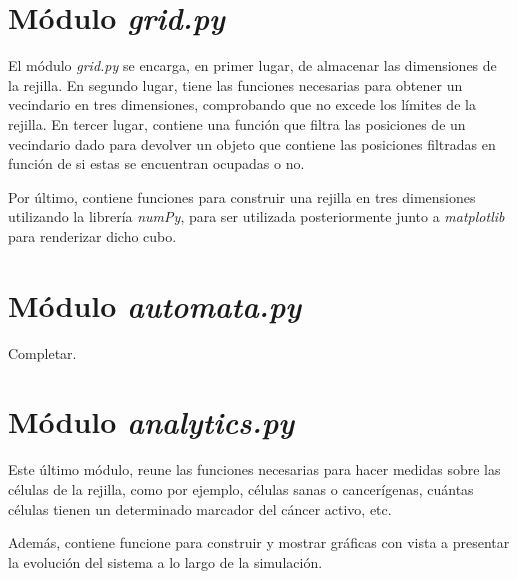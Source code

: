 \section{Módulo \textit{grid.py}}

El módulo \textit{grid.py} se encarga, en primer lugar, de almacenar las dimensiones de la
rejilla. En segundo lugar, tiene las funciones necesarias para obtener un vecindario en
tres dimensiones, comprobando que no excede los límites de la rejilla. En tercer lugar, contiene
una función que filtra las posiciones de un vecindario dado para devolver un objeto que contiene
las posiciones filtradas en función de si estas se encuentran ocupadas o no.

Por último, contiene funciones para construir una rejilla en tres dimensiones utilizando
la librería \textit{numPy}, para ser utilizada posteriormente junto a \textit{matplotlib}
para renderizar dicho cubo.

\section{Módulo \textit{automata.py}}

Completar.

\section{Módulo \textit{analytics.py}}

Este último módulo, reune las funciones necesarias para hacer medidas sobre las células
de la rejilla, como por ejemplo, células sanas o cancerígenas, cuántas células tienen un
determinado marcador del cáncer activo, etc.

Además, contiene funcione para construir y mostrar gráficas con vista a presentar la evolución
del sistema a lo largo de la simulación.
